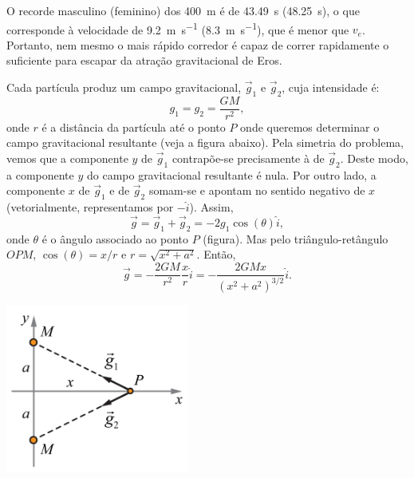 \documentclass[a4paper]{article}
\begin{document}
\begin{resolucoes}
\begin{exercicio}
\begin{enumerate}
  O recorde masculino (feminino) dos \SI{400}{\metre} é de \SI{43.49}{\second} (\SI{48.25}{\second}), o que corresponde à velocidade de \SI{9.2}{\metre\per\second} (\SI{8.3}{\metre\per\second}), que é menor que $v_e$.
  Portanto, nem mesmo o mais rápido corredor é capaz de correr rapidamente o suficiente para escapar da atração gravitacional de Eros.

  \end{enumerate}
  \end{exercicio}
  
  \begin{exercicio}
   
  Cada partícula produz um campo gravitacional, $\vec g_1$ e $\vec g_2$, cuja intensidade é:
  \begin{equation*}
  g_1 = g_2 = \frac{GM}{r^2},
  \end{equation*}
  onde $r$ é a distância da partícula até o ponto $P$ onde queremos determinar o campo gravitacional resultante (veja a figura abaixo).
  Pela simetria do problema, vemos que a componente $y$ de $\vec g_1$ contrapõe-se precisamente à de $\vec g_2$.
  Deste modo, a componente $y$ do campo gravitacional resultante é nula.
  Por outro lado, a componente $x$ de $\vec g_1$ e de $\vec g_2$ somam-se e apontam no sentido negativo de $x$ (vetorialmente, representamos por $-\hat i$).
  Assim,
  \begin{equation*}
  \vec g = \vec g_1 + \vec g_2 = -2g_1\cos(\theta)\hat i,
  \end{equation*}
  onde $\theta$ é o ângulo associado ao ponto $P$ (figura).
  Mas pelo triângulo-retângulo $OPM$, $\cos(\theta)=x/r$ e $r = \sqrt{x^2 + a^2}$.
  Então,
  \begin{equation*}
  \vec g = -\frac{2GM}{r^2}\frac{x}{r}\hat i = -\frac{2GMx}{\left(x^2 + a^2\right)^{3/2}} \hat i.
  \end{equation*}

  \begin{center}
  \includegraphics[width=0.45\textwidth]{fig002}
  \end{center}


\end{exercicio}
\end{resolucoes}
\end{document}
